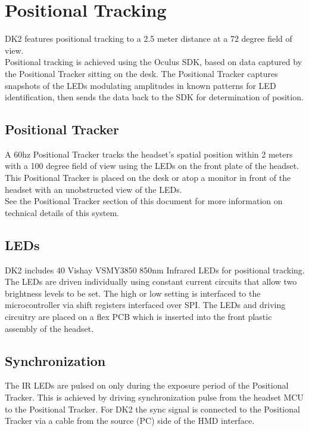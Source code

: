 \documentclass[letterpaper]{article}
\begin{document}
\newpage

\section{Positional Tracking}
DK2 features positional tracking to a 2.5 meter distance at a 72 degree field of view. \\

Positional tracking is achieved using the Oculus SDK, based on data captured by the Positional Tracker sitting on the desk. The Positional Tracker captures snapshots of the LEDs modulating amplitudes in known patterns for LED identification, then sends the data back to the SDK for determination of position.

\subsection{Positional Tracker}
A 60hz Positional Tracker tracks the headset's spatial position within 2 meters with a 100 degree field of view using the LEDs on the front plate of the headset. This Positional Tracker is placed on the desk or atop a monitor in front of the headset with an unobstructed view of the LEDs. \\

See the Positional Tracker section of this document for more information on technical details of this system.

\subsection{LEDs}
DK2 includes 40 Vishay VSMY3850 850nm Infrared LEDs for positional tracking.  The LEDs are driven individually using constant current circuits that allow two brightness levels to be set.  The high or low setting is interfaced to the microcontroller via shift registers interfaced over SPI.  The LEDs and driving circuitry are placed on a flex PCB which is inserted into the front plastic assembly of the headset.

\subsection{Synchronization}
The IR LEDs are pulsed on only during the exposure period of the Positional Tracker.  This is achieved by driving synchronization pulse from the headset MCU to the Positional Tracker.  For DK2 the sync signal is connected to the Positional Tracker via a cable from the source (PC) side of the HMD interface.
\end{document}
